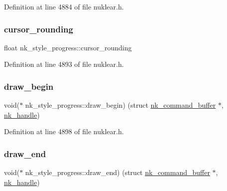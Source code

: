 Definition at line 4884 of file nuklear.\+h.

\mbox{\label{structnk__style__progress_aa9b02af7e3b67fc361cd367331abce93}} 
\subsubsection{\texorpdfstring{cursor\+\_\+rounding}{cursor\_rounding}}
{\footnotesize\ttfamily float nk\+\_\+style\+\_\+progress\+::cursor\+\_\+rounding}



Definition at line 4893 of file nuklear.\+h.

\mbox{\label{structnk__style__progress_a8ad1b31c585c9146d1cdb5956edae910}} 
\subsubsection{\texorpdfstring{draw\+\_\+begin}{draw\_begin}}
{\footnotesize\ttfamily void($\ast$ nk\+\_\+style\+\_\+progress\+::draw\+\_\+begin) (struct \mbox{\hyperlink{structnk__command__buffer}{nk\+\_\+command\+\_\+buffer}} $\ast$, \mbox{\hyperlink{unionnk__handle}{nk\+\_\+handle}})}



Definition at line 4898 of file nuklear.\+h.

\mbox{\label{structnk__style__progress_a81cf48d7ef586bbe7ec6144e9e78541c}} 
\subsubsection{\texorpdfstring{draw\+\_\+end}{draw\_end}}
{\footnotesize\ttfamily void($\ast$ nk\+\_\+style\+\_\+progress\+::draw\+\_\+end) (struct \mbox{\hyperlink{structnk__command__buffer}{nk\+\_\+command\+\_\+buffer}} $\ast$, \mbox{\hyperlink{unionnk__handle}{nk\+\_\+handle}})}



